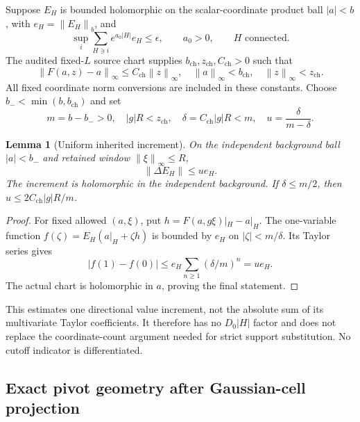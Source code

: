 \documentclass[11pt]{article}
\newtheorem{lemma}[theorem]{Lemma}
\theoremstyle{remark}
\newcommand{\norm}[1]{\left\|#1\right\|}
\begin{document}
Suppose $E_H$ is bounded holomorphic on the scalar-coordinate
product ball $|a|<b$, with $e_H=\norm{E_H}_b$, and
\begin{equation}\label{qi-inherited-norm}
 \sup_i\sum_{H\ni i}e^{a_0|H|}e_H\le\epsilon,
 \qquad a_0>0,\qquad H\text{ connected}.
\end{equation}
The audited fixed-$L$ source chart supplies
$b_{\mathrm{ch}},z_{\mathrm{ch}},C_{\mathrm{ch}}>0$ such that
\begin{equation}\label{qi-displacement}
 \norm{F(a,z)-a}_\infty\le C_{\mathrm{ch}}\norm z_\infty,
 \quad \norm a_\infty<b_{\mathrm{ch}},\quad
       \norm z_\infty<z_{\mathrm{ch}}.
\end{equation}
All fixed coordinate norm conversions are included in these constants.
Choose $b_-<\min(b,b_{\mathrm{ch}})$ and set
\begin{equation}\label{qi-domain-budget}
 m=b-b_->0,\quad |g|R<z_{\mathrm{ch}},\quad
 \delta=C_{\mathrm{ch}}|g|R<m,\quad
 u=\frac{\delta}{m-\delta}.
\end{equation}

\begin{lemma}[Uniform inherited increment]\label{qi-increment-lemma}
On the independent background ball $|a|<b_-$ and retained
window $\norm\xi_\infty\le R$,
\begin{equation}\label{qi-increment-bound}
 \norm{\Delta E_H}\le u e_H.
\end{equation}
The increment is holomorphic in the independent background.
If $\delta\le m/2$, then $u\le2C_{\mathrm{ch}}|g|R/m$.
\end{lemma}
\begin{proof}
For fixed allowed $(a,\xi)$, put
$h=F(a,g\xi)|_H-a|_H$. The one-variable function
$f(\zeta)=E_H(a|_H+\zeta h)$ is bounded by $e_H$ on
$|\zeta|<m/\delta$. Its Taylor series gives
\[
 |f(1)-f(0)|\le e_H\sum_{n\ge1}(\delta/m)^n=u e_H.
\]
The actual chart is holomorphic in $a$, proving the final statement.
\end{proof}
This estimates one directional value increment, not the absolute
sum of its multivariate Taylor coefficients. It therefore has
no $D_0|H|$ factor and does not replace the coordinate-count
argument needed for strict support substitution. No cutoff
indicator is differentiated.

\subsection{Exact pivot geometry after Gaussian-cell projection}
\end{document}
